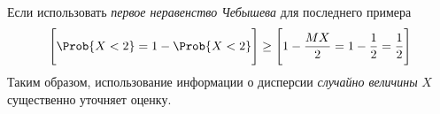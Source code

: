 \begin{rem}
	Если использовать \textit{первое неравенство Чебышева} для последнего примера
	\[
		\Biggl[\Prob \{ X < 2 \} = 1 - \Prob \{ X < 2 \}\Biggr] \geq \Biggl[1 - \frac{MX}{2} = 1 - \frac{1}{2} = \frac{1}{2}\Biggr] 
	\]
	Таким образом, использование информации о дисперсии \textit{случайно величины} $X$ существенно уточняет оценку.
\end{rem}
